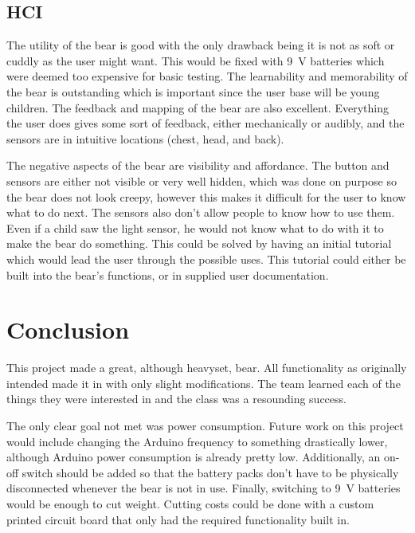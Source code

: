 \documentclass{article}
\begin{document}
\subsection{HCI}
The utility of the bear is good with the only drawback being it is not as soft or cuddly as the user might want. This would be fixed with 9~V batteries which were deemed too expensive for basic testing. The learnability and memorability of the bear is outstanding which is important since the user base will be young children. The feedback and mapping of the bear are also excellent. Everything the user does gives some sort of feedback, either mechanically or audibly, and the sensors are in intuitive locations (chest, head, and back).

The negative aspects of the bear are visibility and affordance. The button and sensors are either not visible or very well hidden, which was done on purpose so the bear does not look creepy, however this makes it difficult for the user to know what to do next. The sensors also don't allow people to know how to use them. Even if a child saw the light sensor, he would not know what to do with it to make the bear do something. This could be solved by having an initial tutorial which would lead the user through the possible uses. This tutorial could either be built into the bear's functions, or in supplied user documentation.

\section{Conclusion}
This project made a great, although heavyset, bear. All functionality as originally intended made it in with only slight modifications. The team learned each of the things they were interested in and the class was a resounding success.

The only clear goal not met was power consumption. Future work on this project would include changing the Arduino frequency to something drastically lower, although Arduino power consumption is already pretty low. Additionally, an on-off switch should be added so that the battery packs don't have to be physically disconnected whenever the bear is not in use. Finally, switching to 9~V batteries would be enough to cut weight. Cutting costs could be done with a custom printed circuit board that only had the required functionality built in.

\clearpage
\end{document}
